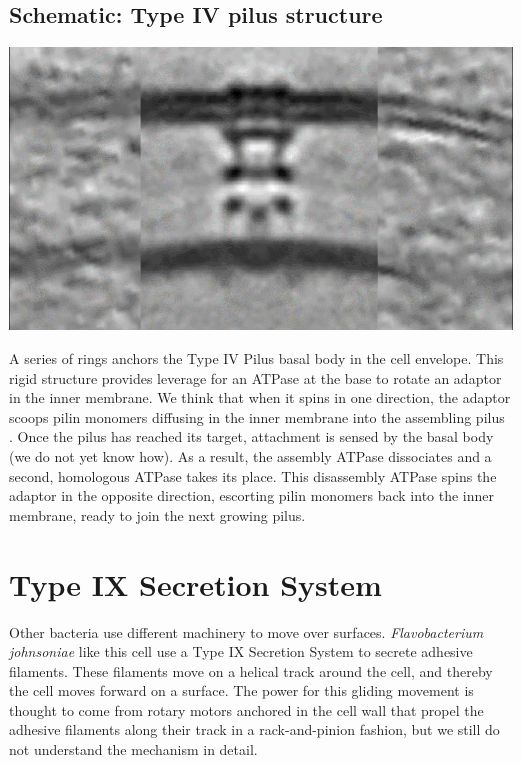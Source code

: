 \documentclass[]{tufte-book}
\begin{document}
\hypertarget{Type_IV_pilus_structure}{%
\subsection*{Schematic: Type IV pilus structure}\label{Type_IV_pilus_structure}}

\includegraphics{img/schematics/6_10_1}

A series of rings anchors the Type IV Pilus basal body in the cell envelope. This rigid structure provides leverage for an ATPase at the base to rotate an adaptor in the inner membrane. We think that when it spins in one direction, the adaptor scoops pilin monomers diffusing in the inner membrane into the assembling pilus \citep{chang2016}. Once the pilus has reached its target, attachment is sensed by the basal body (we do not yet know how). As a result, the assembly ATPase dissociates and a second, homologous ATPase takes its place. This disassembly ATPase spins the adaptor in the opposite direction, escorting pilin monomers back into the inner membrane, ready to join the next growing pilus.

\hypertarget{type-ix-secretion-system}{%
\section{Type IX Secretion System}\label{type-ix-secretion-system}}

Other bacteria use different machinery to move over surfaces. \emph{Flavobacterium johnsoniae} like this cell use a Type IX Secretion System to secrete adhesive filaments. These filaments move on a helical track around the cell, and thereby the cell moves forward on a surface. The power for this gliding movement is thought to come from rotary motors anchored in the cell wall that propel the adhesive filaments along their track in a rack-and-pinion fashion, but we still do not understand the mechanism in detail.
\end{document}
